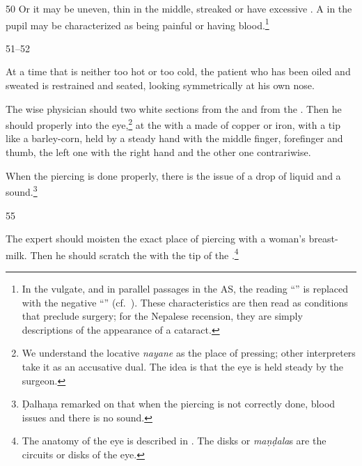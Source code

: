 \begin{translation}
    \item [50] Or it may be uneven, thin in the middle, streaked or have excessive
    . A  in the pupil may be characterized as being
    painful or having blood.\footnote{In the vulgate, and in parallel passages in the
    AS, the reading “” is replaced with the negative “” (cf.\ ).   These characteristics are then
    read as conditions that preclude surgery;  for the Nepalese recension, they are
    simply descriptions of the appearance of a cataract.}
    
    \item [51--52]
    
    At a time that is neither too hot or too cold, 
    the patient who has been oiled and sweated
    is restrained and seated, looking symmetrically at his own nose.
    
    The wise physician should  two white sections from the
     and from the . 
    Then he should 
     properly into the eye,\footnote{We 
    understand the
    locative \emph{nayane} as the place of pressing; other interpreters take it as an
    accusative dual.  The idea is that the eye is held steady by the surgeon.} at the
      with a
    made of copper or iron, with a tip like a barley-corn, held by a steady
    hand with the middle finger, forefinger and thumb,
    the left one with the right hand and the other one contrariwise.
    
    When the piercing is done properly, there is the issue of a drop of liquid and a 
    sound.\footnote{Ḍalhaṇa  remarked on  that when the piercing is not 
    correctly done, blood issues and there is no sound.}
%    
    
    \item [55]
    
    The expert should moisten the exact place of piercing  with a woman's breast-milk.  Then 
    he 
    should scratch the  with the tip of the 
    .\footnote{The anatomy of the eye is described in 
    .
    The disks or 
    \emph{maṇḍala}s are the circuits or disks of the eye.}
    

\end{translation}
